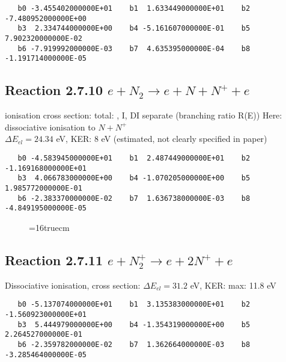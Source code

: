 \documentclass[12pt,dvipdfmx]{article}
\begin{document}
\begin{small}\begin{verbatim}
   b0 -3.455402000000E+01    b1  1.633449000000E+01    b2 -7.480952000000E+00
   b3  2.334744000000E+00    b4 -5.161607000000E-01    b5  7.902320000000E-02
   b6 -7.919992000000E-03    b7  4.635395000000E-04    b8 -1.191714000000E-05
\end{verbatim}\end{small}

\subsection{
Reaction 2.7.10  $e + N_2 \rightarrow e + N + N^+ +e$ }
ionisation cross section: total: \cite{kn:Rapp1}, I, DI separate \cite{kn:Rapp2} (branching ratio R(E))
Here: dissociative ionisation to $N + N^+$ \\
$\Delta E_{el} = 24.34 $ eV, KER: 8 eV  (estimated, not clearly specified in paper)

\begin{small}\begin{verbatim}
   b0 -4.583945000000E+01    b1  2.487449000000E+01    b2 -1.169168000000E+01
   b3  4.066783000000E+00    b4 -1.070205000000E+00    b5  1.985772000000E-01
   b6 -2.383370000000E-02    b7  1.636738000000E-03    b8 -4.849195000000E-05
\end{verbatim}\end{small}


\begin{figure} \label{n2rates}
\epsfxsize=16truecm
\end{figure}
\newpage

\subsection{
Reaction 2.7.11  $e + N_2^+ \rightarrow e + 2 N^+ +e$ }
Dissociative ionisation, cross section: \cite{kn:Bahati}
$\Delta E_{el} = 31.2 $ eV, KER: max: 11.8 eV

\begin{small}\begin{verbatim}
   b0 -5.137074000000E+01    b1  3.135383000000E+01    b2 -1.560923000000E+01
   b3  5.444979000000E+00    b4 -1.354319000000E+00    b5  2.264527000000E-01
   b6 -2.359782000000E-02    b7  1.362664000000E-03    b8 -3.285464000000E-05
\end{verbatim}\end{small}
\end{document}
